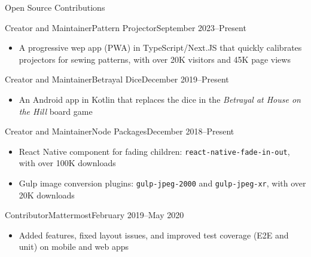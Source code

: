 \documentclass[]{mcdowellcv}
\begin{document}
	\begin{cvsection}{Open Source Contributions}
    \begin{cvsubsection}{Creator and Maintainer}{Pattern Projector}{September 2023--Present}
      \begin{itemize}
        \item A progressive wep app (PWA) in TypeScript/Next.JS that quickly calibrates projectors for sewing patterns, with over 20K visitors and 45K page views
      \end{itemize}
    \end{cvsubsection}
  
    \begin{cvsubsection}{Creator and Maintainer}{Betrayal Dice}{December 2019--Present}
      \begin{itemize}
        \item An Android app in Kotlin that replaces the dice in the \textit{Betrayal at House on the Hill} board game
      \end{itemize}
    \end{cvsubsection}
    
    \begin{cvsubsection}{Creator and Maintainer}{Node Packages}{December 2018--Present}
      \begin{itemize}
        \item React Native component for fading children: \texttt{react-native-fade-in-out}, with over 100K downloads
        \item Gulp image conversion plugins: \texttt{gulp-jpeg-2000} and \texttt{gulp-jpeg-xr}, with over 20K downloads
      \end{itemize}
    \end{cvsubsection}	
  
    \begin{cvsubsection}{Contributor}{Mattermost}{February 2019--May 2020}
      \begin{itemize}
        \item Added features, fixed layout issues, and improved test coverage (E2E and unit) on mobile and web apps
      \end{itemize}
    \end{cvsubsection}
  \end{cvsection}
\end{document}
